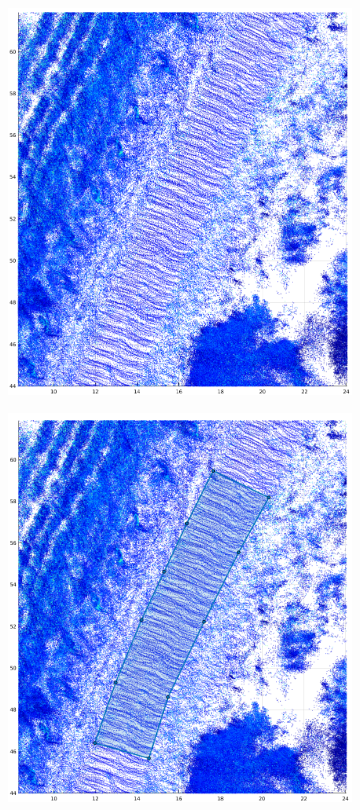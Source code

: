 \documentclass[numbered,pdftex]{ohio-etd}
\begin{document}
{{{{				\begin{figure}[H]
					\centering
					\begin{subfigure}{0.45\textwidth}
						\centering
						\includegraphics[width=1.0\linewidth]{Defense_Images/pre_select_area}
						\caption[Bean Hollow Road Satellite View]{}
						\label{fig:pre_select_area}
					\end{subfigure}
					\begin{subfigure}{0.45\textwidth}
						\centering
						\includegraphics[width=1.0\linewidth]{Defense_Images/area_selected}

\end{subfigure}
\end{figure}}}}}
\end{document}

